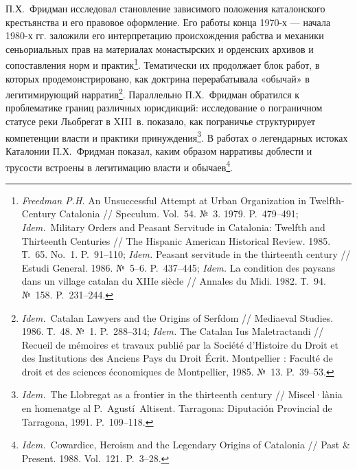 П.Х.~Фридман исследовал становление зависимого положения каталонского крестьянства и его правовое оформление. Его работы конца 1970-х --- начала 1980-х гг. заложили его интерпретацию происхождения рабства и механики сеньориальных прав на материалах монастырских и орденских архивов и сопоставления норм и практик\footnote{\emph{Freedman P.H.} An Unsuccessful Attempt at Urban Organization in Twelfth-Century Catalonia // Speculum. Vol.~54. №~3. 1979. P.~479--491; \emph{Idem.}~Military Orders and Peasant Servitude in Catalonia: Twelfth and Thirteenth Centuries // The Hispanic American Historical Review. 1985. Т.~65. No.~1. P.~91--110; \emph{Idem. }Peasant servitude in the thirteenth century // Estudi General. 1986. №~5--6. P.~437--445; \emph{Idem.} La condition des paysans dans un village catalan du XIIIe siècle // Annales du Midi. 1982. Т.~94. №~158. P.~231--244.}. Тематически их продолжает блок работ, в которых продемонстрировано, как доктрина перерабатывала «обычай» в легитимирующий нарратив\footnote{\emph{Idem.}~Catalan Lawyers and the Origins of Serfdom // Mediaeval Studies. 1986. Т.~48. №~1. P.~288--314; \emph{Idem. }The Catalan Ius Maletractandi // Recueil de mémoires et travaux publié par la Société d’Histoire du Droit et des Institutions des Anciens Pays du Droit Écrit. Montpellier : Faculté de droit et des sciences économiques de Montpellier, 1985. №~13. P.~39--53.}. Параллельно П.Х.~Фридман обратился к проблематике границ различных юрисдикций: исследование о пограничном статусе реки Льобрегат в XIII~в. показало, как пограничье структурирует компетенции власти и практики принуждения\footnote{\emph{Idem.}~The Llobregat as a frontier in the thirteenth century // Miscel·lània en homenatge al P.~Agustí~Altisent. Tarragona: Diputación Provincial de Tarragona, 1991. P.~109--118.}. В работах о легендарных истоках Каталонии П.Х.~Фридман показал, каким образом нарративы доблести и трусости встроены в легитимацию власти и обычаев\footnote{\emph{Idem.}~Cowardice, Heroism and the Legendary Origins of Catalonia // Past \& Present. 1988. Vol.~121. P.~3--28.}.

